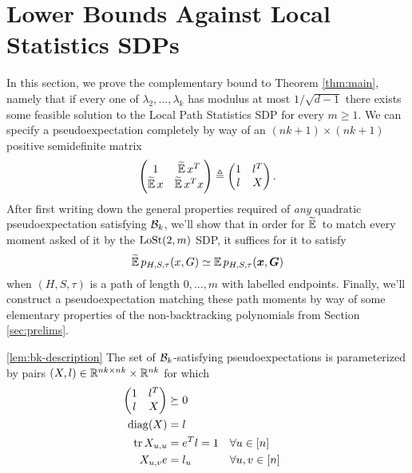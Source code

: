 \section{Lower Bounds Against Local Statistics SDPs}
\label{sec:lower-bound}

In this section, we prove the complementary bound to Theorem \ref{thm:main}, namely that if every one of $\lambda_2,...,\lambda_k$ has modulus at most $1/\sqrt{d-1}$ there exists some feasible solution to the Local Path Statistics SDP for every $m \ge 1$. We can specify a pseudoexpectation completely by way of an $(nk + 1)\times(nk+1)$ positive semidefinite matrix
$$
   \begin{pmatrix} 1 & \widetilde{\operatorname*{\mathbb{E}}}\, x^T \\ \widetilde{\operatorname*{\mathbb{E}}}\, x & \widetilde{\operatorname*{\mathbb{E}}}\, x^Tx \end{pmatrix} 
    \triangleq \begin{pmatrix} 1 & l^T \\ l & X \end{pmatrix}.
$$
After first writing down the general properties required of \textit{any} quadratic pseudoexpectation satisfying $\mathcal{B}_k$, we'll show that in order for $\widetilde{\operatorname*{\mathbb{E}}}\,$ to match every moment asked of it by the $\operatorname{LoSt}(2,m)$ SDP, it suffices for it to satisfy
$$
    \widetilde{\operatorname*{\mathbb{E}}}\, p_{H,S,\tau}(x,G) \simeq \operatorname*{\mathbb{E}} p_{H,S,\tau}({\boldsymbol{x}},\boldsymbol{G})
$$
when $(H,S,\tau)$ is a path of length $0,...,m$ with labelled endpoints. Finally, we'll construct a pseudoexpectation matching these path moments by way of some elementary properties of the non-backtracking polynomials from Section \ref{sec:prelims}.

\begin{lemma} \ref{lem:bk-description}
    The set of $\mathcal{B}_k$-satisfying pseudoexpectations is parameterized by pairs $(X,l) \in \mathbb{R}^{nk\times nk}\times \mathbb{R}^{nk}$ for which
    \begin{align}
        \begin{pmatrix} 1 & l^T \\ l& X \end{pmatrix} &\succeq 0 \\
        \operatorname{diag}(X) &= l \\
        \operatorname{tr} X_{u,u} &= e^T l = 1 & &\forall u\in[n]  \\
        X_{u,v}e &= l_u & &\forall u,v\in[n]
    \end{align}
\end{lemma}

